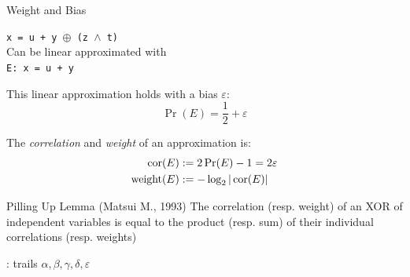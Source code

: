 \documentclass[aspectratio=169,9pt]{beamer}
\begin{document}
\begin{frame}{Weight and Bias}

\begin{center}
\texttt{x = u + y $\oplus$ (z $\land$ t)}\\
Can be linear approximated with\\
\texttt{E: x = u + y}
\end{center}

This linear approximation holds with a bias $\varepsilon$:
$$\Pr(E) = \frac{1}{2} + \varepsilon$$

The {\it correlation} and {\it weight} of an approximation is:
\begin{align*}
\operatorname{cor}(E) &:= 2\Pr(E)-1 = 2 \varepsilon\\
\operatorname{weight}(E) &:= -\log_2|\operatorname{cor}(E)|
\end{align*}

\begin{alertblock}{Pilling Up Lemma (Matsui M., 1993)}
  The correlation (resp. weight) of an XOR of independent variables is equal to
  the product (resp. sum) of their individual correlations (resp. weights)
\end{alertblock}

\end{frame}


\begin{frame}{\MiniMORUS : trails $\alpha, \beta, \gamma, \delta, \varepsilon$}

  \begin{figure}
    \substatesfalse
    \rotwfalse
    \statesfalse
    \messagefalse

    \resizebox{!}{0.78\textheight}{%
    
    }
    \resizebox{!}{0.78\textheight}{%
    
    }
    \resizebox{!}{0.78\textheight}{%
    
    }
    \resizebox{!}{0.78\textheight}{%
    
    }
    \resizebox{!}{0.78\textheight}{%
    
    }
  \end{figure}

\end{frame}



\end{document}
